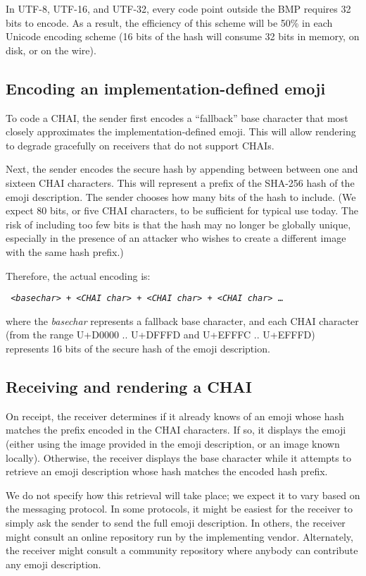 \documentclass[12pt]{article}
\begin{document}
In UTF-8, UTF-16, and UTF-32, every code point outside the BMP
requires 32 bits to encode. As a result, the efficiency of
this scheme will be 50\% in each Unicode encoding scheme (16 bits of
the hash will consume 32 bits in memory, on disk, or on the wire).

\subsection{Encoding an implementation-defined emoji}

To code a CHAI, the sender first encodes a ``fallback'' base character
that most closely approximates the implementation-defined emoji. This
will allow rendering to degrade gracefully on receivers that do not
support CHAIs.

Next, the sender encodes the secure hash by appending between between
one and sixteen CHAI characters. This will represent a prefix of the
SHA-256 hash of the emoji description. The sender chooses how many
bits of the hash to include. (We expect 80 bits, or five CHAI
characters, to be sufficient for typical use today. The risk of
including too few bits is that the hash may no longer be globally unique,
especially in the presence of an attacker who wishes to create a different
image with the same hash prefix.)

Therefore, the actual encoding is:

\texttt { <\textit{basechar}> + <\textit{CHAI char}> + <\textit{CHAI char}> + <\textit{CHAI char}> \ldots }

where the \textit{basechar} represents a fallback base character, and
each CHAI character (from the range U+D0000 .. U+DFFFD and U+EFFFC
.. U+EFFFD) represents 16 bits of the secure hash of the emoji
description.

\subsection{Receiving and rendering a CHAI}

On receipt, the receiver determines if it already knows of an emoji
whose hash matches the prefix encoded in the CHAI characters. If so,
it displays the emoji (either using the image provided in the emoji
description, or an image known locally). Otherwise, the receiver
displays the base character while it attempts to retrieve an emoji
description whose hash matches the encoded hash prefix.

We do not specify how this retrieval will take place; we expect it to
vary based on the messaging protocol. In some protocols, it might be
easiest for the receiver to simply ask the sender to send the full
emoji description. In others, the receiver might consult an online
repository run by the implementing vendor. Alternately, the receiver
might consult a community repository where anybody can contribute any
emoji description.
\end{document}

